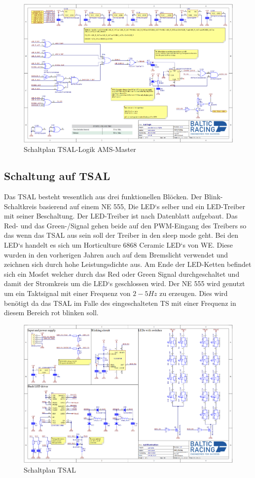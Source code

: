 \begin{figure}
	\centering
	\includegraphics[width=1\linewidth]{"bilder/TSAL Logik AMS Master"}
	\caption{Schaltplan \ac{TSAL}-Logik \ac{AMS}-Master}
	\label{fig:tsal-logik-ams-master}
\end{figure}

\FloatBarrier
\subsection{Schaltung auf \ac{TSAL}}

Das \ac{TSAL} besteht wesentlich aus drei funktionellen Blöcken. Der Blink-Schaltkreis basierend auf einem NE 555, Die \ac{LED}`s selber und ein \ac{LED}-Treiber mit seiner Beschaltung. Der \ac{LED}-Treiber ist nach Datenblatt aufgebaut. Das Red- und das Green-/Signal gehen beide auf den \ac{PWM}-Eingang des Treibers so das wenn das \ac{TSAL} aus sein soll der Treiber in den sleep mode geht. Bei den \ac{LED}`s handelt es sich um Horticulture 6868 Ceramic \ac{LED}`s von \ac{WE}. Diese wurden in den vorherigen Jahren auch auf dem Bremslicht verwendet und zeichnen sich durch hohe Leistungsdichte aus. Am Ende der \ac{LED}-Ketten befindet sich ein Mosfet welcher durch das Red oder Green Signal durchgeschaltet und damit der Stromkreis um die \ac{LED}`s geschlossen wird. Der NE 555 wird genutzt um ein Taktsignal mit einer Frequenz von \ensuremath{2-5 Hz} zu erzeugen. Dies wird benötigt da das \ac{TSAL} im Falle des eingeschalteten \ac{TS} mit einer Frequenz in diesem Bereich rot blinken soll.

\begin{figure}
	\centering
	\includegraphics[width=1\linewidth]{"bilder/Tsal Schematic"}
	\caption{Schaltplan \ac{TSAL}}
	\label{fig:tsal-schematic}
\end{figure}

\FloatBarrier